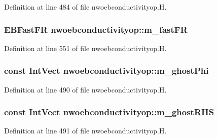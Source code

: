 Definition at line 484 of file nwoebconductivityop.\+H.

\subsubsection[{\texorpdfstring{m\+\_\+fast\+FR}{m_fastFR}}]{\setlength{\rightskip}{0pt plus 5cm}E\+B\+Fast\+FR nwoebconductivityop\+::m\+\_\+fast\+FR\hspace{0.3cm}{\ttfamily [protected]}}\hypertarget{classnwoebconductivityop_a03a22af12102c9da8cf44f21ef421801}{}\label{classnwoebconductivityop_a03a22af12102c9da8cf44f21ef421801}


Definition at line 551 of file nwoebconductivityop.\+H.

\subsubsection[{\texorpdfstring{m\+\_\+ghost\+Phi}{m_ghostPhi}}]{\setlength{\rightskip}{0pt plus 5cm}const Int\+Vect nwoebconductivityop\+::m\+\_\+ghost\+Phi\hspace{0.3cm}{\ttfamily [protected]}}\hypertarget{classnwoebconductivityop_a4441723c67c5fc9b73d2f05c227d0780}{}\label{classnwoebconductivityop_a4441723c67c5fc9b73d2f05c227d0780}


Definition at line 490 of file nwoebconductivityop.\+H.

\subsubsection[{\texorpdfstring{m\+\_\+ghost\+R\+HS}{m_ghostRHS}}]{\setlength{\rightskip}{0pt plus 5cm}const Int\+Vect nwoebconductivityop\+::m\+\_\+ghost\+R\+HS\hspace{0.3cm}{\ttfamily [protected]}}\hypertarget{classnwoebconductivityop_a37c7e0d842dac341e29050e1cdc085c4}{}\label{classnwoebconductivityop_a37c7e0d842dac341e29050e1cdc085c4}


Definition at line 491 of file nwoebconductivityop.\+H.

